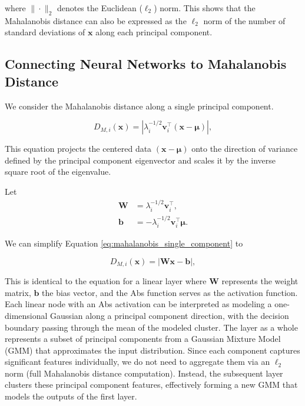 where $\| \cdot \|_2$ denotes the Euclidean ($\ell_2$) norm. This shows that the Mahalanobis distance can also be expressed as the $\ell_2$ norm of the number of standard deviations of \(\mathbf{x}\) along each principal component.

\subsection{Connecting Neural Networks to Mahalanobis Distance}

We consider the Mahalanobis distance along a single principal component.

\begin{equation}
    \label{eq:mahalanobis_single_component}
    D_{M,i}(\mathbf{x}) = \left| \lambda_i^{-1/2} \mathbf{v}_i^\top (\mathbf{x} - \boldsymbol{\mu}) \right|,
\end{equation}

This equation projects the centered data $(\mathbf{x} - \boldsymbol{\mu})$ onto the direction of variance defined by the principal component eigenvector and scales it by the inverse square root of the eigenvalue.

Let 
\begin{align}
    \mathbf{W} &= \lambda_i^{-1/2} \mathbf{v}_i^\top, \\
    \mathbf{b} &= - \lambda_i^{-1/2} \mathbf{v}_i^\top \boldsymbol{\mu}.
\end{align}

We can simplify Equation \eqref{eq:mahalanobis_single_component} to

\begin{equation}
    \label{eq:mahalanobis_linear}
    D_{M,i}(\mathbf{x}) = \left| \mathbf{W} \mathbf{x} - \mathbf{b} \right|,
\end{equation}

This is identical to the equation for a linear layer where $\boldsymbol{W}$ represents the weight matrix, $\boldsymbol{b}$ the bias vector, and the Abs function serves as the activation function. Each linear node with an Abs activation can be interpreted as modeling a one-dimensional Gaussian along a principal component direction, with the decision boundary passing through the mean of the modeled cluster. The layer as a whole represents a subset of principal components from a Gaussian Mixture Model (GMM) that approximates the input distribution. Since each component captures significant features individually, we do not need to aggregate them via an $\ell_2$ norm (full Mahalanobis distance computation). Instead, the subsequent layer clusters these principal component features, effectively forming a new GMM that models the outputs of the first layer.

